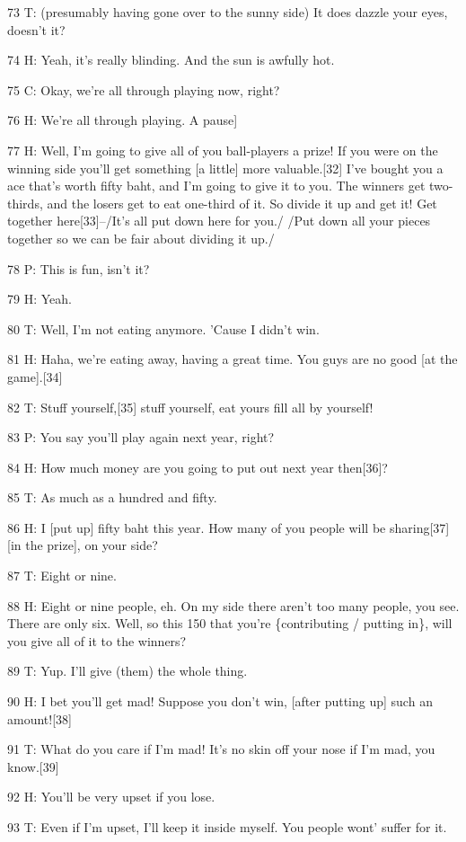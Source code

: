 73 T: (presumably having gone over to the sunny side) It does dazzle your eyes,
doesn't it?

74 H: Yeah, it's really blinding. And the sun is awfully hot.

75 C: Okay, we're all through playing now, right?

76 H: We're all through playing. A pause]

77 H: Well, I'm going to give all of you ball-players a prize! If you were on the
winning side you'll get something [a little] more valuable.[32] I've bought you
a ace that's worth fifty baht, and I'm going to give it to you. The winners get
two-thirds, and the losers get to eat one-third of it. So divide it up and get
it! Get together here[33]--/It's all put down here for you./ /Put down all your
pieces together so we can be fair about dividing it up./

78 P: This is fun, isn't it?

79 H: Yeah.

80 T: Well, I'm not eating anymore. 'Cause I didn't win.

81 H: Haha, we're eating away, having a great time. You guys are no good [at the
game].[34]

82 T: Stuff yourself,[35] stuff yourself, eat yours fill all by yourself!

83 P: You say you'll play again next year, right?

84 H: How much money are you going to put out next year then[36]?

85 T: As much as a hundred and fifty.

86 H: I [put up] fifty baht this year. How many of you people will be sharing[37]
[in the prize], on your side?

87 T: Eight or nine.

88 H: Eight or nine people, eh. On my side there aren't too many people, you see.
There are only six. Well, so this 150 that you're \{contributing / putting in\},
will you give all of it to the winners?

89 T: Yup. I'll give (them) the whole thing.

90 H: I bet you'll get mad! Suppose you don't win, [after putting up] such an amount![38]

91 T: What do you care if I'm mad! It's no skin off your nose if I'm mad, you know.[39]

92 H: You'll be very upset if you lose.

93 T: Even if I'm upset, I'll keep it inside myself. You people wont' suffer for
it.

